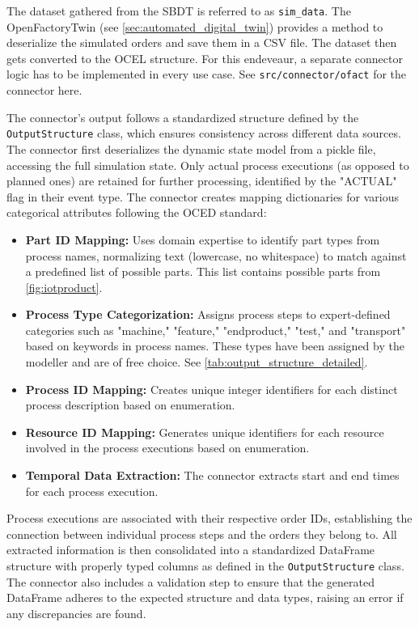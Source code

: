 The dataset gathered from the SBDT is referred to as \texttt{sim\_data}. The OpenFactoryTwin (see \autoref{sec:automated_digital_twin}) provides a method to deserialize the simulated orders and save them in a CSV file. The dataset then gets converted to the OCEL structure. For this endeveaur, a separate connector logic has to be implemented in every use case. See \texttt{src/connector/ofact} for the connector here.

The connector's output follows a standardized structure defined by the \texttt{OutputStructure} class, which ensures consistency across different data sources. The connector first deserializes the dynamic state model from a pickle file, accessing the full simulation state. Only actual process executions (as opposed to planned ones) are retained for further processing, identified by the "ACTUAL" flag in their event type. The connector creates mapping dictionaries for various categorical attributes following the OCED standard:

\begin{itemize}
  \item \textbf{Part ID Mapping:} Uses domain expertise to identify part types from process names, normalizing text (lowercase, no whitespace) to match against a predefined list of possible parts. This list contains possible parts from \autoref{fig:iotproduct}.
  \item \textbf{Process Type Categorization:} Assigns process steps to expert-defined categories such as "machine," "feature," "endproduct," "test," and "transport" based on keywords in process names. These types have been assigned by the modeller and are of free choice. See \autoref{tab:output_structure_detailed}.
  \item \textbf{Process ID Mapping:} Creates unique integer identifiers for each distinct process description based on enumeration.
  \item \textbf{Resource ID Mapping:} Generates unique identifiers for each resource involved in the process executions based on enumeration.
  \item \textbf{Temporal Data Extraction:} The connector extracts start and end times for each process execution.
\end{itemize}

Process executions are associated with their respective order IDs, establishing the connection between individual process steps and the orders they belong to. All extracted information is then consolidated into a standardized DataFrame structure with properly typed columns as defined in the \texttt{OutputStructure} class. The connector also includes a validation step to ensure that the generated DataFrame adheres to the expected structure and data types, raising an error if any discrepancies are found.

